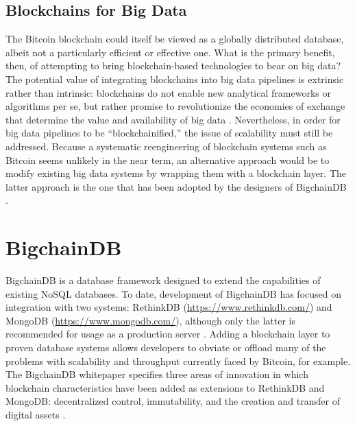 \documentclass[sigconf]{acmart}
\begin{document}
\subsection{Blockchains for Big Data}
The Bitcoin blockchain could itself be viewed as a globally distributed database, albeit not a particularly efficient or effective one. What is the primary benefit, then, of attempting to bring blockchain-based technologies to bear on big data? The potential value of integrating blockchains into big data pipelines is extrinsic rather than intrinsic: blockchains do not enable new analytical frameworks or algorithms per se, but rather promise to revolutionize the economies of exchange that determine the value and availability of big data \cite{tMBD16}. Nevertheless, in order for big data pipelines to be ``blockchainified,'' the issue of scalability must still be addressed. Because a systematic reengineering of blockchain systems such as Bitcoin seems unlikely in the near term, an alternative approach would be to modify existing big data systems by wrapping them with a blockchain layer. The latter approach is the one that has been adopted by the designers of BigchainDB \cite{bigDB16}.

\section{BigchainDB}
BigchainDB is a database framework designed to extend the capabilities of existing NoSQL databases. To date, development of BigchainDB has focused on integration with two systems: RethinkDB (\url{https://www.rethinkdb.com/}) and MongoDB (\url{https://www.mongodb.com/}), although only the latter is recommended for usage as a production server \cite{bigDB17b}. Adding a blockchain layer to proven database systems allows developers to obviate or offload many of the problems with scalability and throughput currently faced by Bitcoin, for example. The BigchainDB whitepaper specifies three areas of innovation in which blockchain characteristics have been added as extensions to RethinkDB and MongoDB: decentralized control, immutability, and the creation and transfer of digital assets \cite{bigDB16}.
\end{document}
